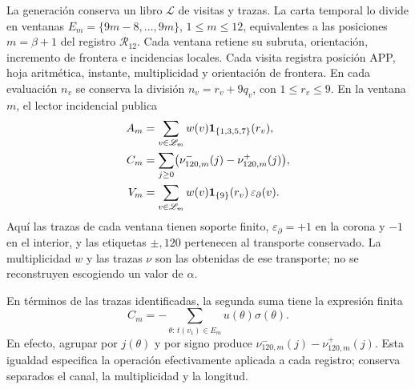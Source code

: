 La generación conserva un libro \(\mathscr L\) de visitas y trazas.
La carta temporal lo divide en ventanas
\(E_m=\{9m-8,\ldots,9m\}\), \(1\le m\le12\),
equivalentes a las posiciones \(m=\beta+1\) del registro
\(\mathcal R_{12}\). Cada ventana retiene su subruta,
orientación, incremento de frontera e incidencias locales.
Cada visita registra posición APP, hoja aritmética, instante, multiplicidad
y orientación de frontera. En cada evaluación \(n_v\) se conserva la
división \(n_v=r_v+9q_v\), con \(1\le r_v\le9\). En la ventana
\(m\), el lector incidencial publica
\begin{align}
 A_m&=\sum_{v\in\mathscr L_m}w(v)
      \mathbf1_{\{1,3,5,7\}}(r_v),\notag\\
 C_m&=\sum_{j\ge0}
       \bigl(\nu^-_{120,m}(j)-\nu^+_{120,m}(j)\bigr),\notag\\
 V_m&=\sum_{v\in\mathscr L_m}w(v)
      \mathbf1_{\{9\}}(r_v)\,\varepsilon_{\partial}(v).
 \label{vi:vi:dep:incidencias}
\end{align}
Aquí las trazas de cada ventana tienen soporte finito,
\(\varepsilon_{\partial}=+1\) en la corona y \(-1\) en el interior,
y las etiquetas \(\pm,120\) pertenecen al transporte conservado.
La multiplicidad \(w\) y las trazas \(\nu\) son las obtenidas de ese
transporte; no se reconstruyen escogiendo un valor de \(\alpha\).

En términos de las trazas identificadas, la segunda suma tiene la
expresión finita
\[
 C_m=-\sum_{\theta:\,t(v_1)\in E_m}u(\theta)\sigma(\theta).
\]
En efecto, agrupar por \(j(\theta)\) y por signo produce
\(\nu^-_{120,m}(j)-\nu^+_{120,m}(j)\). Esta igualdad especifica
la operación efectivamente aplicada a cada registro; conserva
separados el canal, la multiplicidad y la longitud.

